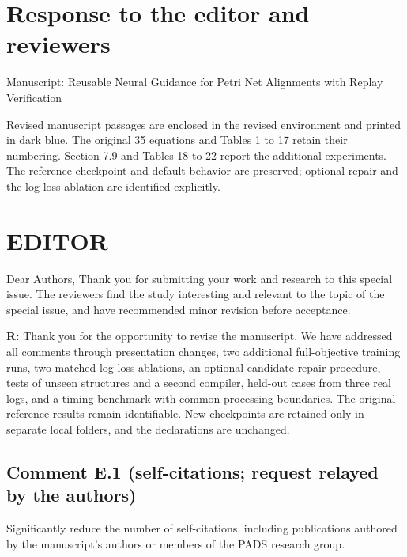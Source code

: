\documentclass[11pt,a4paper]{article}
\newenvironment{reviewercomment}{%
  \begin{list}{}{\setlength{\leftmargin}{1.5em}%
    \setlength{\rightmargin}{0pt}\setlength{\topsep}{0.5em}}%
  \item\relax\color{reviewerred}\ignorespaces
}{\end{list}}
\begin{document}
\section*{Response to the editor and reviewers}

Manuscript: Reusable Neural Guidance for Petri Net Alignments with Replay Verification\par

Revised manuscript passages are enclosed in the revised environment and printed in dark blue. The original 35 equations and Tables 1 to 17 retain their numbering. Section 7.9 and Tables 18 to 22 report the additional experiments. The reference checkpoint and default behavior are preserved; optional repair and the log-loss ablation are identified explicitly.\par


\section*{EDITOR}

\begin{reviewercomment}Dear Authors, Thank you for submitting your work and research to this special issue. The reviewers find the study interesting and relevant to the topic of the special issue, and have recommended minor revision before acceptance.\end{reviewercomment}

{\color{black}\textbf{R:} Thank you for the opportunity to revise the manuscript. We have addressed all comments through presentation changes, two additional full-objective training runs, two matched log-loss ablations, an optional candidate-repair procedure, tests of unseen structures and a second compiler, held-out cases from three real logs, and a timing benchmark with common processing boundaries. The original reference results remain identifiable. New checkpoints are retained only in separate local folders, and the declarations are unchanged.\par}

\subsection*{Comment E.1 (self-citations; request relayed by the authors)}

\begin{reviewercomment}Significantly reduce the number of self-citations, including publications authored by the manuscript's authors or members of the PADS research group.\end{reviewercomment}
\end{document}
